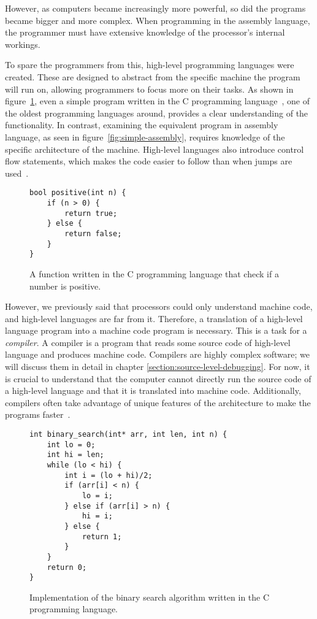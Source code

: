 However, as computers became increasingly more powerful, so did the programs
became bigger and more complex. When programming in the assembly language, the
programmer must have extensive knowledge of the processor's internal workings.

To spare the programmers from this, high-level programming languages were
created. These are designed to abstract from the specific machine the program
will run on, allowing programmers to focus more on their tasks. As shown in
figure~\ref{fig:c-positive}, even a simple program written in the C programming
language~\cite{krc}, one of the oldest programming languages around, provides a
clear understanding of the functionality. In contrast, examining the equivalent
program in assembly language, as seen in figure~\ref{fig:simple-assembly},
requires knowledge of the specific architecture of the machine. High-level
languages also introduce control flow statements, which makes the code easier
to follow than when jumps are used~\cite{gotobad}.

\begin{figure}
\begin{verbatim}
bool positive(int n) {
    if (n > 0) {
        return true;
    } else {
        return false;
    }
}
\end{verbatim}
\caption{A function written in the C programming language that check if a
    number is positive.}
\label{fig:c-positive}
\end{figure}

However, we previously said that processors could only understand machine code,
and high-level languages are far from it. Therefore, a translation of a
high-level language program into a machine code program is necessary. This is a
task for a \textit{compiler}. A compiler is a program that reads some source
code of high-level language and produces machine code. Compilers are highly
complex software; we will discuss them in detail in chapter
\ref{section:source-level-debugging}. For now, it is crucial to understand that
the computer cannot directly run the source code of a high-level language and
that it is translated into machine code. Additionally, compilers often take
advantage of unique features of the architecture to make the programs
faster~\cite{dragon-book}.

\begin{figure}[H]
    \begin{verbatim}
int binary_search(int* arr, int len, int n) {
    int lo = 0;
    int hi = len;
    while (lo < hi) {
        int i = (lo + hi)/2;
        if (arr[i] < n) {
            lo = i;
        } else if (arr[i] > n) {
            hi = i;
        } else {
            return 1;
        }
    }
    return 0;
}
    \end{verbatim}
    \caption{Implementation of the binary search algorithm written in the C
    programming language.}
    \label{fig:binary-search}
\end{figure}

